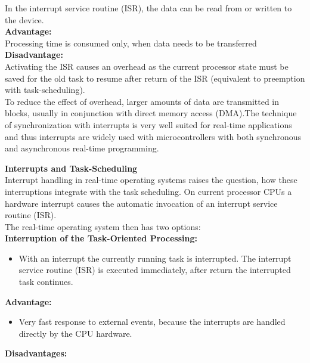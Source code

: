 In the interrupt service routine (ISR), the data can be read from or written to the device.\\

\textbf{Advantage: }\\Processing time is consumed only, when data needs to be transferred\\

\textbf{Disadvantage: }\\Activating the ISR causes an overhead as the current processor state must be    saved for the old task to resume after return of the ISR    (equivalent to preemption with task-scheduling).\\

To reduce the effect of overhead, larger amounts of data are transmitted in blocks, usually in conjunction with direct memory access (DMA).The technique of synchronization with interrupts is very well suited for real-time applications and thus interrupts are widely used with microcontrollers with both synchronous and asynchronous real-time programming.
\newpage

{\rot\bf Interrupts and Task-Scheduling}\\

Interrupt handling in real-time operating systems raises the question, how these interruptions integrate with the task scheduling. On current processor CPUs a hardware interrupt causes the automatic invocation of an interrupt service routine (ISR). \\

The real-time operating system then has two options:\\

\textbf{Interruption of the Task-Oriented Processing: }

\begin{itemize}
	\item With an interrupt the currently running task is interrupted. The interrupt service routine (ISR) is executed immediately, after return the interrupted task continues.
\end{itemize}

\textbf{Advantage: } 

\begin{itemize}
	\item Very fast response to external events, because the interrupts are handled directly   by the CPU hardware.
\end{itemize} 

\textbf{Disadvantages: }

